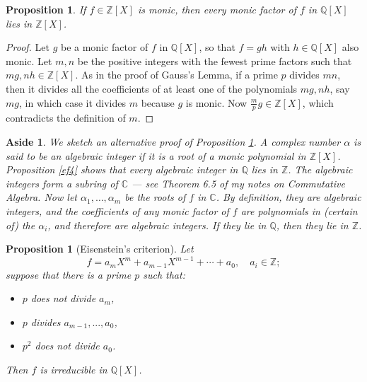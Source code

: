 \documentclass[a4paper,11pt,final,openany]{memoir}
\newtheorem{proposition}[X]{Proposition}
\newtheorem{aside}[X]{Aside}
\theoremstyle{nonumberplain}
\newtheorem{proof}{Proof.}
\begin{document}
\begin{proposition}
\label{ef6m}If $f\in\mathbb{Z}[X]$ is monic, then every monic factor of $f$ in
$\mathbb{Q}[X]$ lies in $\mathbb{Z}[X]$.
\end{proposition}

\begin{proof}
Let $g$ be a monic factor of $f$ in $\mathbb{Q}{}[X]$, so that $f=gh$ with
$h\in\mathbb{Q}{}[X]$ also monic. Let $m,n$ be the positive integers with the
fewest prime factors such that $mg,nh\in\mathbb{Z}{}[X]$. As in the proof of
Gauss's Lemma, if a prime $p$ divides $mn$, then it divides all the
coefficients of at least one of the polynomials $mg,nh$, say $mg$, in which
case it divides $m$ because $g$ is monic. Now $\frac{m}{p}g\in\mathbb{Z}[X]$,
which contradicts the definition of $m$.
\end{proof}

\begin{aside}
\label{ef6n}We sketch an alternative proof of Proposition \ref{ef6m}. A
complex number $\alpha$ is said to be an \emph{algebraic integer}%
if it is a root of a monic polynomial in $\mathbb{Z}{}[X]$. Proposition
\ref{ef4} shows that every algebraic integer in $\mathbb{Q}{}$ lies in
$\mathbb{Z}$. The algebraic integers form a subring of $\mathbb{C}{}$ --- see
Theorem 6.5 of my notes on Commutative Algebra. Now let $\alpha_{1}%
,\ldots,\alpha_{m}$ be the roots of $f$ in $\mathbb{C}{}$. By definition, they
are algebraic integers, and the coefficients of any monic factor of $f$ are
polynomials in (certain of) the $\alpha_{i}$, and therefore are algebraic
integers. If they lie in $\mathbb{Q}{}$, then they lie in $\mathbb{Z}{}$.
\end{aside}

\begin{proposition}
[Eisenstein's criterion]\label{ef7}%
%
Let
\[
f=a_{m}X^{m}+a_{m-1}X^{m-1}+\cdots+a_{0},\quad a_{i}\in\mathbb{Z};
\]
suppose that there is a prime $p$ such that:

\begin{itemize}
\item $p$ does not divide $a_{m}$,

\item $p$ divides $a_{m-1},...,a_{0}$,

\item $p^{2}$ does not divide $a_{0}$.
\end{itemize}

\noindent Then $f$ is irreducible in $\mathbb{Q}[X]$.
\end{proposition}
\end{document}
